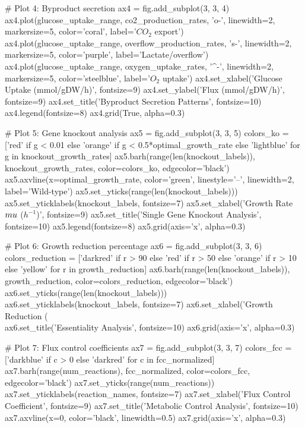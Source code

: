 \documentclass[a4paper, 11pt]{article}
\begin{document}
\begin{pycode}
# Plot 4: Byproduct secretion
ax4 = fig.add_subplot(3, 3, 4)
ax4.plot(glucose_uptake_range, co2_production_rates, 'o-', linewidth=2, markersize=5,
         color='coral', label='$CO_2$ export')
ax4.plot(glucose_uptake_range, overflow_production_rates, 's-', linewidth=2, markersize=5,
         color='purple', label='Lactate/overflow')
ax4.plot(glucose_uptake_range, oxygen_uptake_rates, '^-', linewidth=2, markersize=5,
         color='steelblue', label='$O_2$ uptake')
ax4.set_xlabel('Glucose Uptake (mmol/gDW/h)', fontsize=9)
ax4.set_ylabel('Flux (mmol/gDW/h)', fontsize=9)
ax4.set_title('Byproduct Secretion Patterns', fontsize=10)
ax4.legend(fontsize=8)
ax4.grid(True, alpha=0.3)

# Plot 5: Gene knockout analysis
ax5 = fig.add_subplot(3, 3, 5)
colors_ko = ['red' if g < 0.01 else 'orange' if g < 0.5*optimal_growth_rate else 'lightblue'
             for g in knockout_growth_rates]
ax5.barh(range(len(knockout_labels)), knockout_growth_rates, color=colors_ko, edgecolor='black')
ax5.axvline(x=optimal_growth_rate, color='green', linestyle='--', linewidth=2, label='Wild-type')
ax5.set_yticks(range(len(knockout_labels)))
ax5.set_yticklabels(knockout_labels, fontsize=7)
ax5.set_xlabel('Growth Rate $\\mu$ ($h^{-1}$)', fontsize=9)
ax5.set_title('Single Gene Knockout Analysis', fontsize=10)
ax5.legend(fontsize=8)
ax5.grid(axis='x', alpha=0.3)

# Plot 6: Growth reduction percentage
ax6 = fig.add_subplot(3, 3, 6)
colors_reduction = ['darkred' if r > 90 else 'red' if r > 50 else 'orange' if r > 10 else 'yellow'
                    for r in growth_reduction]
ax6.barh(range(len(knockout_labels)), growth_reduction, color=colors_reduction, edgecolor='black')
ax6.set_yticks(range(len(knockout_labels)))
ax6.set_yticklabels(knockout_labels, fontsize=7)
ax6.set_xlabel('Growth Reduction (\\%
ax6.set_title('Essentiality Analysis', fontsize=10)
ax6.grid(axis='x', alpha=0.3)

# Plot 7: Flux control coefficients
ax7 = fig.add_subplot(3, 3, 7)
colors_fcc = ['darkblue' if c > 0 else 'darkred' for c in fcc_normalized]
ax7.barh(range(num_reactions), fcc_normalized, color=colors_fcc, edgecolor='black')
ax7.set_yticks(range(num_reactions))
ax7.set_yticklabels(reaction_names, fontsize=7)
ax7.set_xlabel('Flux Control Coefficient', fontsize=9)
ax7.set_title('Metabolic Control Analysis', fontsize=10)
ax7.axvline(x=0, color='black', linewidth=0.5)
ax7.grid(axis='x', alpha=0.3)


\end{pycode}
\end{document}
